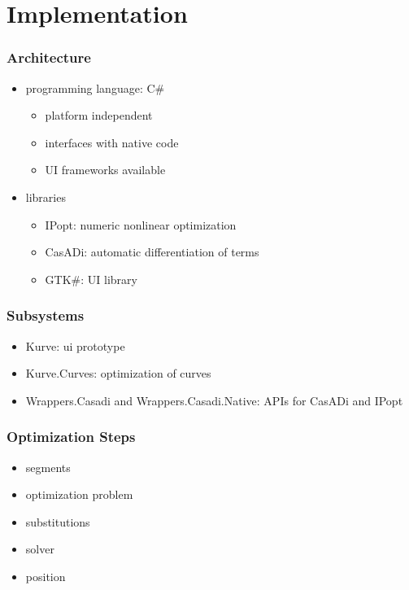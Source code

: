 \documentclass{beamer}
\begin{document}
	\section{Implementation}
	
		\begin{frame}
			\frametitle{Architecture}
			\begin{itemize}
				\item programming language: C\#
				\begin{itemize}
					\item platform independent
					\item interfaces with native code
					\item UI frameworks available
				\end{itemize}
				\item libraries
				\begin{itemize}
					\item IPopt: numeric nonlinear optimization
					\item CasADi: automatic differentiation of terms
					\item GTK\#: UI library
				\end{itemize}
			\end{itemize}
		\end{frame}
		
		\begin{frame}
			\frametitle{Subsystems}
			\begin{itemize}
				\item Kurve: ui prototype
				\item Kurve.Curves: optimization of curves
				\item Wrappers.Casadi and Wrappers.Casadi.Native: APIs for CasADi and IPopt
			\end{itemize}
		\end{frame}
		
		\begin{frame}
			\frametitle{Optimization Steps}
			\begin{itemize}
				\item segments
				\item optimization problem
				\item substitutions
				\item solver
				\item position
			\end{itemize}
		\end{frame}
		
		
\end{document}

